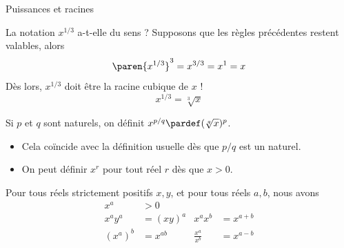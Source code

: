 \begin{frame}{Puissances et racines}
  \begin{example}
    La notation \(x^{1/3}\) a-t-elle du sens ? \pause
    Supposons que les règles précédentes restent valables, alors
    \begin{equation*}
      \paren{x^{1/3}}^{3} = x^{3/3} = x^{1} = x
    \end{equation*}\pause
    Dès lors, \(x^{1/3}\) doit être la racine cubique de \(x\) !
    \begin{equation*}
      x^{1/3} = \sqrt[3]{x}
    \end{equation*}
  \end{example}\pause
  \begin{definition}
    Si \(p\) et \(q\) sont naturels, on définit \(x^{p/q} \pardef (\sqrt[q]{x})^{p}\).
  \end{definition}
  \begin{remark}
    \begin{itemize}
    \item Cela coïncide avec la définition usuelle dès que \(p/q\) est un naturel.
    \item On peut définir \(x^{r}\) pour tout réel \(r\) dès que \(x > 0\).
    \end{itemize}
  \end{remark}
\end{frame}
\begin{frame}
  \begin{property}%
    \label{resultat-puissances}
    Pour tous réels strictement positifs \(x,y\), et pour tous réels \(a,b\), nous avons
    \begin{align}
      x^{a} &> 0\\
      x^{a} y^{a} &= (xy)^{a}  & x^{a} x^{b} &= x^{a+b}\\
      (x^{a})^{b} &= x^{ab} & \frac{x^{a}}{x^{b}} &= x^{a-b}
    \end{align}
  \end{property}
\end{frame}


